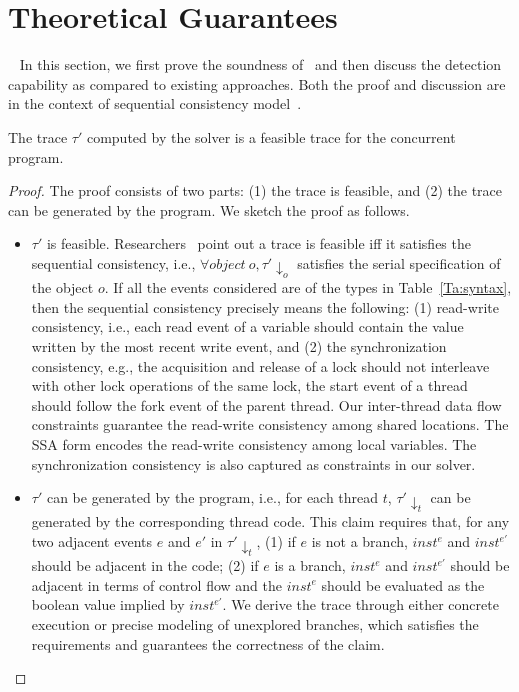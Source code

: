\section{Theoretical Guarantees}~\label{sec:guarantee}
In this section, we first prove the soundness of \tool\ and then discuss the detection capability as compared to existing approaches.
Both the proof and discussion are in the context of sequential consistency model~\cite{scmodel}.

\begin{mytheorem}[Soundness]
The trace $\tau'$ computed by the solver is a feasible trace for the concurrent program.
\end{mytheorem}

\begin{proof}\let\qed\relax
The proof consists of two parts: (1) the trace is feasible, and (2) the trace can be generated by the program. We sketch the proof as follows.
\begin{itemize}
\item  $\tau'$ is feasible. Researchers~\cite{chao,maximal} point out a 
trace is feasible iff it satisfies the sequential consistency, 
i.e., $\forall object\ o, \tau'\downarrow_{o}$ satisfies the serial 
specification of the object $o$. If  all the events considered are of 
the types in Table~\ref{Ta:syntax}, then the sequential consistency 
precisely means the following: (1) read-write consistency, i.e., each 
read event of a variable should contain the value written by the most 
recent write event, and (2) the synchronization consistency, e.g., the 
acquisition and release of a lock should not interleave with other 
lock operations of the same lock, the start event of a thread should 
follow the fork event of the parent thread. Our inter-thread data 
flow constraints guarantee the read-write consistency among shared 
locations. The SSA form encodes the read-write consistency among local 
variables. The synchronization consistency is also captured as constraints 
in our solver. 
\item $\tau'$ can be generated by the program, i.e., for each 
thread $t$, $\tau'\downarrow_{t}$ can be generated by the corresponding 
thread code. This claim requires that,  for any two adjacent 
events $e$ and $e'$ in  $\tau'\downarrow_{t}$, (1) if $e$ is not a 
branch, $inst^e$ and $inst^{e'}$ should be adjacent in the code; (2) 
if $e$ is a branch, $inst^e$ and $inst^{e'}$ should be adjacent in terms
of control flow and the $inst^e$ should be evaluated as the boolean 
value implied by $inst^{e'}$. We derive the trace  through either 
concrete execution or precise modeling of unexplored branches, 
which satisfies the requirements and guarantees the correctness of the claim.
\end{itemize}
\end{proof}



